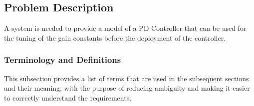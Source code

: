 \documentclass[12pt]{article}
\begin{document}
\subsection{Problem Description}
\label{Sec:ProbDesc}
A system is needed to provide a model of a PD Controller that can be used for the tuning of the gain constants before the deployment of the controller.

\subsubsection{Terminology and Definitions}
\label{Sec:TermDefs}
This subsection provides a list of terms that are used in the subsequent sections and their meaning, with the purpose of reducing ambiguity and making it easier to correctly understand the requirements.
\end{document}
